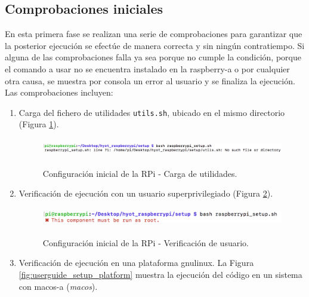 \documentclass[12pt,a4paper, twoside]{report}
\begin{document}
	\subsection{Comprobaciones iniciales}
	
	En esta primera fase se realizan una serie de comprobaciones para garantizar que la posterior ejecución se efectúe de manera correcta y sin ningún contratiempo. Si alguna de las comprobaciones falla ya sea porque no cumple la condición, porque el comando a usar no se encuentra instalado en la \gls{raspberry-a} o por cualquier otra causa, se muestra por consola un error al usuario y se finaliza la ejecución. Las comprobaciones incluyen:

	\begin{enumerate}
		\item Carga del fichero de utilidades \texttt{utils.sh}, ubicado en el mismo directorio (Figura \ref{fig:userguide_setup_utils}).

		\begin{figure}[!ht]   
			\caption{Configuración inicial de la RPi - Carga de utilidades.} 
			\begin{center} 
				\includegraphics[width=17cm,height=0.8cm]{Images/userGuide/setup/utils} \\
				\label{fig:userguide_setup_utils} 
			\end{center}  
		\end{figure}

		\item Verificación de ejecución con un usuario superprivilegiado (Figura \ref{fig:userguide_setup_root}).
		
		\begin{figure}[!ht]   
			\caption{Configuración inicial de la RPi - Verificación de usuario.} 
			\begin{center} 
				\includegraphics[width=14cm,height=0.8cm]{Images/userGuide/setup/root} \\
				\label{fig:userguide_setup_root} 
			\end{center}  
		\end{figure}
		
		\item Verificación de ejecución en una plataforma \gls{gnulinux}. La Figura \ref{fig:userguide_setup_platform} muestra la ejecución del código en un sistema con \gls{macos-a} (\textit{\gls{macos}}). 
		

\end{enumerate}
\end{document}
